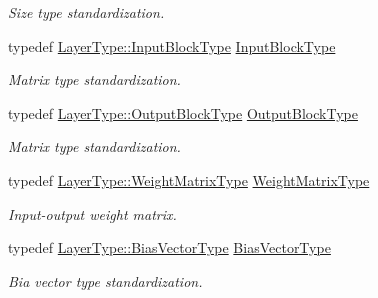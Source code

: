 \begin{DoxyCompactItemize}
\begin{DoxyCompactList}\small\item\em Size type standardization. \end{DoxyCompactList}\item 
typedef \hyperlink{classffnn_1_1layer_1_1_fully_connected_a8fb8f9b598085d3a05214f38f70adfc7}{Layer\-Type\-::\-Input\-Block\-Type} \hyperlink{classffnn_1_1optimizer_1_1_adam_3_01layer_1_1_fully_connected_3_01_value_type_00_01_inputs_at_co08ce471fd3ee7441a350cc42cfd35bcd_a0f9a1a492d0763a6068fd01c3c8d705a}{Input\-Block\-Type}
\begin{DoxyCompactList}\small\item\em Matrix type standardization. \end{DoxyCompactList}\item 
typedef \hyperlink{classffnn_1_1layer_1_1_fully_connected_ac8c5ba1f20f470095c2c37f881f49814}{Layer\-Type\-::\-Output\-Block\-Type} \hyperlink{classffnn_1_1optimizer_1_1_adam_3_01layer_1_1_fully_connected_3_01_value_type_00_01_inputs_at_co08ce471fd3ee7441a350cc42cfd35bcd_a6b5ddc1adcb4bbc052bda25ac5ecef0b}{Output\-Block\-Type}
\begin{DoxyCompactList}\small\item\em Matrix type standardization. \end{DoxyCompactList}\item 
typedef \hyperlink{classffnn_1_1layer_1_1_fully_connected_a4ceb72064ac9a73a0907cc369d229da0}{Layer\-Type\-::\-Weight\-Matrix\-Type} \hyperlink{classffnn_1_1optimizer_1_1_adam_3_01layer_1_1_fully_connected_3_01_value_type_00_01_inputs_at_co08ce471fd3ee7441a350cc42cfd35bcd_aac2f4d3e444074ab554d2a0a45ba1daf}{Weight\-Matrix\-Type}
\begin{DoxyCompactList}\small\item\em Input-\/output weight matrix. \end{DoxyCompactList}\item 
typedef \hyperlink{classffnn_1_1layer_1_1_fully_connected_a926ff519682fa1bedd4c38159d5fd4bb}{Layer\-Type\-::\-Bias\-Vector\-Type} \hyperlink{classffnn_1_1optimizer_1_1_adam_3_01layer_1_1_fully_connected_3_01_value_type_00_01_inputs_at_co08ce471fd3ee7441a350cc42cfd35bcd_ac7a23bb92a19d1155a19feefbb5d366d}{Bias\-Vector\-Type}
\begin{DoxyCompactList}\small\item\em Bia vector type standardization. \end{DoxyCompactList}\end{DoxyCompactItemize}
